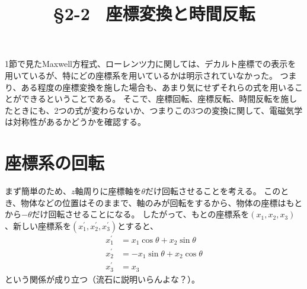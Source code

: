 \documentclass[a4paper]{jsarticle}
\title{\S 2-2 \ 座標変換と時間反転}
\begin{document}
\maketitle

1節で見たMaxwell方程式、ローレンツ力に関しては、デカルト座標での表示を用いているが、特にどの座標系を用いているかは明示されていなかった。
つまり、ある程度の座標変換を施した場合も、あまり気にせずそれらの式を用いることができるということである。
そこで、座標回転、座標反転、時間反転を施したときにも、2つの式が変わらないか、つまりこの3つの変換に関して、電磁気学は対称性があるかどうかを確認する。

\section{座標系の回転}
まず簡単のため、$z$軸周りに座標軸を$\theta$だけ回転させることを考える。
このとき、物体などの位置はそのままで、軸のみが回転をするから、物体の座標はもとから$-\theta$だけ回転させることになる。
したがって、もとの座標系を$(x_1, x_2, x_3)$、新しい座標系を$(x_1^{\prime}, x_2^{\prime}, x_3^{\prime})$とすると、
\begin{align}
	x_1^{\prime} &= x_1 \cos \theta + x_2 \sin \theta \\
	x_2^{\prime} &= - x_1 \sin \theta + x_2 \cos \theta \\
	x_3^{\prime} &= x_3
\end{align}
という関係が成り立つ（流石に説明いらんよな？）。
\end{document}
